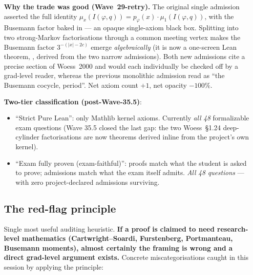 \documentclass[11pt,a4paper]{article}
\theoremstyle{plain}
\theoremstyle{definition}
\begin{document}
\textbf{Why the trade was good (Wave~29-retry).} The original
single admission 
asserted the full identity
$\mu_x(I(\varphi,q)) = p_\varphi(x) \cdot \mu_1(I(\varphi,q))$, with
the Busemann factor baked in --- an opaque single-axiom black box.
Splitting into two strong-Markov factorisations through a common
meeting vertex makes the Busemann factor $3^{-(|x|-2c)}$ emerge
\emph{algebraically} (it is now a one-screen Lean theorem,
, derived from
the two narrow admissions). Both new admissions cite a precise
section of Woess~2000 and would each individually be checked off by
a grad-level reader, whereas the previous monolithic admission read
as ``the Busemann cocycle, period''. Net axiom count $+1$, net
opacity $-100\%$.

\textbf{Two-tier classification (post-Wave-35.5)}:
\begin{itemize}[leftmargin=1.5em]
\item ``Strict Pure Lean'': only Mathlib kernel axioms. Currently
  \emph{all 48} formalizable exam questions (Wave 35.5 closed the
  last gap: the two Woess~\S1.24 deep-cylinder factorisations are
  now theorems derived inline from the project's own kernel).
\item ``Exam fully proven (exam-faithful)'': proofs match what the
  student is asked to prove; admissions match what the exam itself
  admits. \emph{All 48 questions} --- with zero project-declared
  admissions surviving.
\end{itemize}

\subsection{The red-flag principle}

Single most useful auditing heuristic. \textbf{If a proof is claimed
to need research-level mathematics (Cartwright--Soardi, Furstenberg,
Portmanteau, Busemann moments), almost certainly the framing is wrong
and a direct grad-level argument exists.} Concrete miscategorisations
caught in this session by applying the principle:
\end{document}
